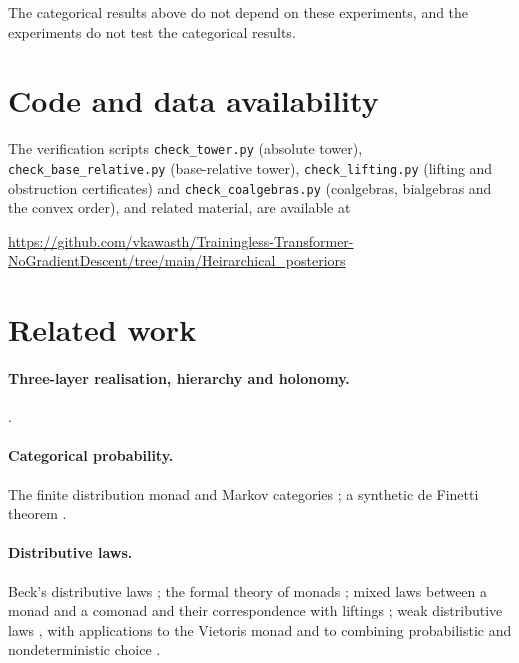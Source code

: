 \documentclass[11pt]{article}
\theoremstyle{definition}
\theoremstyle{remark}
\begin{document}
The categorical results above do not depend on these experiments, and the experiments do not test
the categorical results.

\section{Code and data availability}

The verification scripts \texttt{check\_tower.py} (absolute tower),
\texttt{check\_base\_relative.py} (base-relative tower), \texttt{check\_lifting.py} (lifting and
obstruction certificates) and \texttt{check\_coalgebras.py} (coalgebras, bialgebras and the convex
order), and related material, are available at
\begin{center}\small\url{https://github.com/vkawasth/Trainingless-Transformer-NoGradientDescent/tree/main/Heirarchical_posteriors}\end{center}

\section{Related work}

\paragraph{Three-layer realisation, hierarchy and holonomy.}
\cite{Awasthi-ThreeLayers,Awasthi-Hierarchy,Awasthi-Holonomy}.
\paragraph{Categorical probability.} The finite distribution monad and Markov categories
\cite{Fritz2020,FGPR2023}; a synthetic de Finetti theorem \cite{FGP2021}.
\paragraph{Distributive laws.} Beck's distributive laws \cite{Beck1969}; the formal theory of monads
\cite{Street1972}; mixed laws between a monad and a comonad and their correspondence with liftings
\cite{PowerWatanabe2002}; weak distributive
laws \cite{Street2009,Bohm2010,BohmLackStreet2011}, with applications to the Vietoris monad
\cite{Garner2020} and to combining probabilistic and nondeterministic choice \cite{GoyPetrisan2020}.
\end{document}
